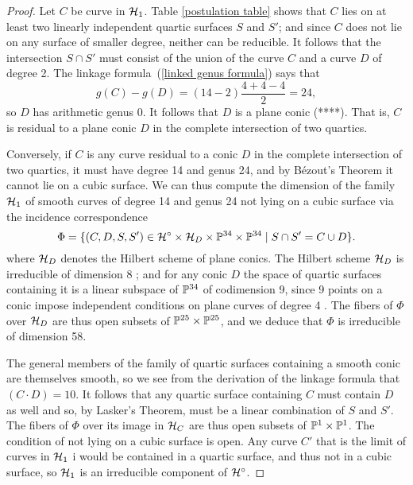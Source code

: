 \begin{proof}
Let $C$ be curve in ${\cal H}_1$. Table \ref{postulation table} shows that $C$ lies on at least two linearly independent quartic surfaces $S$ and $S'$; and since $C$ does not lie on any surface of smaller degree, neither can be reducible. It follows that the intersection $S \cap S'$ must consist of the union of the curve $C$ and a curve $D$ of degree 2. The linkage formula~(\ref{linked genus formula}) says that
$$
g(C) - g(D) = (14 - 2)\frac{4+4-4}{2} = 24,
$$
so $D$ has arithmetic genus 0. It follows that $D$ is a plane conic (****).  That is, $C$ is residual to a plane conic $D$ in the complete intersection of two quartics. 

Conversely, if $C$ is any curve residual to a conic $D$ in the complete intersection of two quartics, it must have degree 14 and genus 24, and by B\'ezout's Theorem it cannot lie on a cubic surface. We can thus compute the dimension of the family ${\cal H}_1$ of smooth curves of degree 14 and genus 24 not lying on a cubic surface via the incidence correspondence
$$
\Phi = \{ (C, D, S, S') \in {\cal H}^\circ \times {\cal H}_D \times {\mathbb P}^{34} \times {\mathbb P}^{34} \mid S \cap S' = C \cup D\}.
$$
where ${\cal H}_D$ denotes the Hilbert scheme of plane conics. The Hilbert scheme ${\cal H}_D$ is irreducible of dimension 8 ; and for any conic $D$ the space of quartic surfaces containing it is a linear subspace of ${\mathbb P}^{34}$ of codimension 9, since 9  points on a conic impose independent conditions on plane curves of degree 4 . The fibers of $\Phi$ over ${\cal H}_D$ are thus open subsets of ${\mathbb P}^{25} \times {\mathbb P}^{25}$, and we deduce that $\Phi$ is irreducible of dimension 58. 

The general members of the family of quartic surfaces containing a smooth conic are themselves smooth, so we see from the derivation of the linkage formula that $(C\cdot D) = 10$. It follows that any quartic surface containing $C$ must contain $D$ as well and so, by Lasker's Theorem, must be a linear combination of $S$ and $S'$.   The fibers of $\Phi$ over its image in ${\cal H}_C$ are thus open subsets of ${\mathbb P}^1 \times {\mathbb P}^1$. 
The condition of not lying on a cubic surface is open. Any curve $C'$ that is the limit of curves in ${\cal H}_1$ i
would be contained in a quartic surface, and thus not in a cubic surface, so ${\cal H}_1$  is an irreducible component of ${\cal H}^\circ$.


\end{proof}
